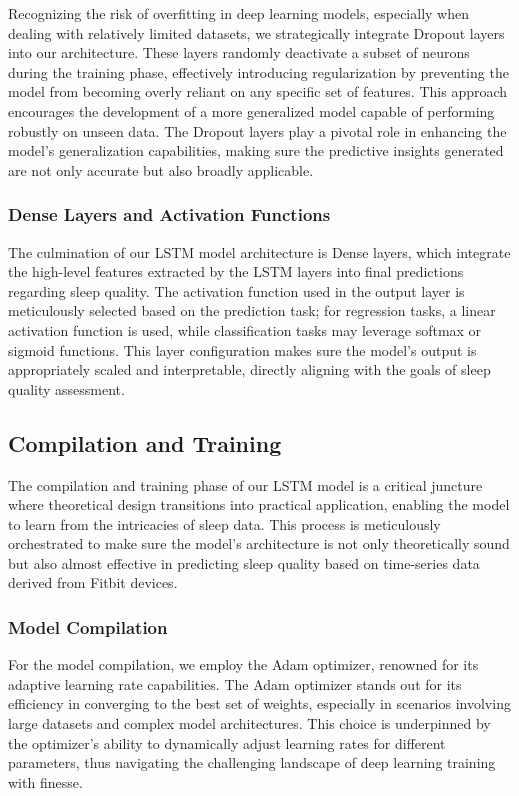 \documentclass[10pt]{extarticle}
\begin{document}
Recognizing the risk of overfitting in deep learning models, especially when dealing with relatively limited datasets, we strategically integrate Dropout layers into our architecture. These layers randomly deactivate a subset of neurons during the training phase, effectively introducing regularization by preventing the model from becoming overly reliant on any specific set of features. This approach encourages the development of a more generalized model capable of performing robustly on unseen data. The Dropout layers play a pivotal role in enhancing the model's generalization capabilities, making sure the predictive insights generated are not only accurate but also broadly applicable.

\subsubsection{Dense Layers and Activation Functions}

The culmination of our LSTM model architecture is Dense layers, which  integrate the high-level features extracted by the LSTM layers into final predictions regarding sleep quality. The activation function used in the output layer is meticulously selected based on the prediction task; for regression tasks, a linear activation function is used, while classification tasks may leverage softmax or sigmoid functions. This layer configuration makes sure the model's output is appropriately scaled and interpretable, directly aligning with the goals of sleep quality assessment.

\subsection{Compilation and Training}

The compilation and training phase of our LSTM model is a critical juncture where theoretical design transitions into practical application, enabling the model to learn from the intricacies of sleep data. This process is meticulously orchestrated to make sure the model's architecture is not only theoretically sound but also almost effective in predicting sleep quality based on time-series data derived from Fitbit devices.

\subsubsection{Model Compilation}

For the model compilation, we employ the Adam optimizer, renowned for its adaptive learning rate capabilities. The Adam optimizer stands out for its efficiency in converging to the best set of weights, especially in scenarios involving large datasets and complex model architectures. This choice is underpinned by the optimizer's ability to dynamically adjust learning rates for different parameters, thus navigating the challenging landscape of deep learning training with finesse.
\end{document}
